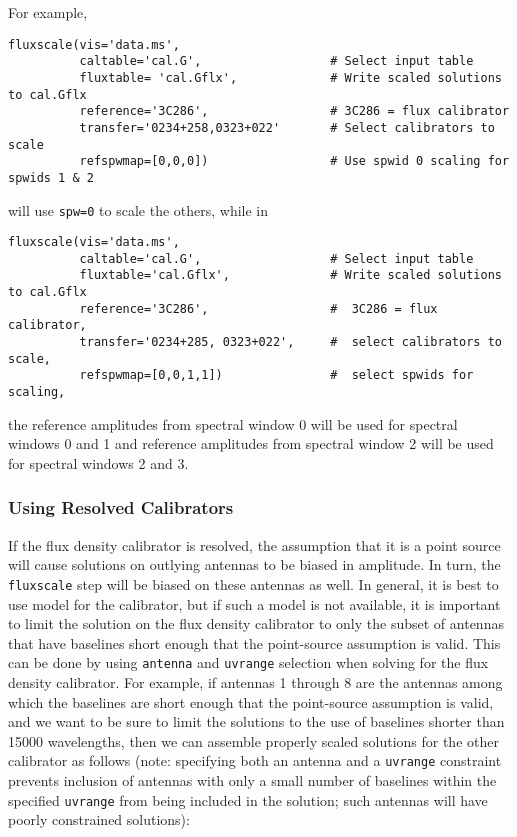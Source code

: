 For example,
\small
\begin{verbatim}
fluxscale(vis='data.ms',
          caltable='cal.G',                  # Select input table
          fluxtable= 'cal.Gflx',             # Write scaled solutions to cal.Gflx
          reference='3C286',                 # 3C286 = flux calibrator
          transfer='0234+258,0323+022'       # Select calibrators to scale
          refspwmap=[0,0,0])                 # Use spwid 0 scaling for spwids 1 & 2
\end{verbatim}
\normalsize
will use {\tt spw=0} to scale the others, while in
\small
\begin{verbatim}
fluxscale(vis='data.ms',
          caltable='cal.G',                  # Select input table
          fluxtable='cal.Gflx',              # Write scaled solutions to cal.Gflx
          reference='3C286',                 #  3C286 = flux calibrator,
          transfer='0234+285, 0323+022',     #  select calibrators to scale,
          refspwmap=[0,0,1,1])               #  select spwids for scaling,
\end{verbatim}
\normalsize
the reference amplitudes from spectral window 0 will be
used for spectral windows 0 and 1 and reference amplitudes from
spectral window 2 will be used for spectral windows 2 and 3.

\subsubsection{Using Resolved Calibrators}
\label{section:cal.solve.fluxscale.resolved}

If the flux density calibrator is resolved, the assumption that it is
a point source will cause solutions on outlying antennas to be biased
in amplitude.  In turn, the {\tt fluxscale} step will be biased
on these antennas as well.  In general, it is best to use 
model for the calibrator, but if such a model is not available,
it is important to limit the solution on the flux density calibrator
to only the subset of antennas that have baselines short enough that
the point-source assumption is valid.  This can be done by using
{\tt antenna} and {\tt uvrange} selection when solving for the flux density
calibrator.  For example, if antennas 1 through 8 are the antennas
among which the baselines are short enough that the point-source
assumption is valid, and we want to be sure to limit the solutions to
the use of baselines shorter than 15000 wavelengths, then we can
assemble properly scaled solutions for the other calibrator as follows
(note: specifying both an antenna and a {\tt uvrange} constraint prevents
inclusion of antennas with only a small number of baselines within the
specified {\tt uvrange} from being included in the solution; such antennas
will have poorly constrained solutions):

